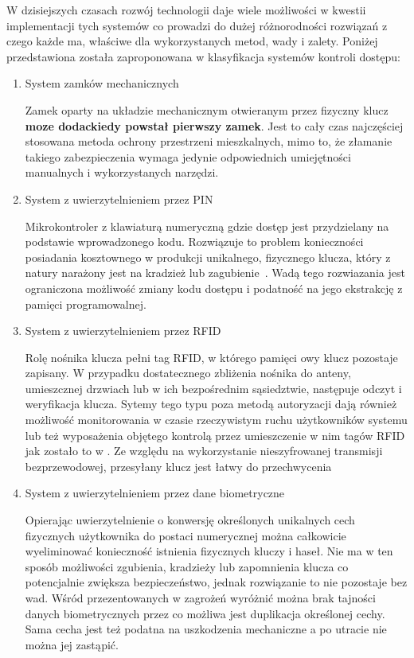 		W dzisiejszych czasach rozwój technologii daje wiele możliwości w kwestii implementacji tych systemów co prowadzi do dużej różnorodności rozwiązań z czego każde ma, właściwe dla wykorzystanych metod, wady i zalety. Poniżej przedstawiona została zaproponowana w \cite{access-system-survey} klasyfikacja systemów kontroli dostępu:
		\begin{enumerate}[label=\Alph*.]
			\item System zamków mechanicznych

				Zamek oparty na układzie mechanicznym otwieranym przez fizyczny klucz \textbf{moze dodackiedy powstał pierwszy zamek}. Jest to cały czas najczęściej stosowana metoda ochrony przestrzeni mieszkalnych, mimo to, że złamanie takiego zabezpieczenia wymaga jedynie odpowiednich umiejętności manualnych i wykorzystanych narzędzi.

			\item System z uwierzytelnieniem przez PIN

				Mikrokontroler z klawiaturą numeryczną gdzie dostęp jest przydzielany na podstawie wprowadzonego kodu. Rozwiązuje to problem konieczności posiadania kosztownego w produkcji unikalnego, fizycznego klucza, który z natury narażony jest na kradzież lub zagubienie~\cite{keypad-access-system}. Wadą tego rozwiazania jest ograniczona możliwość zmiany kodu dostępu i podatność na jego ekstrakcję z pamięci programowalnej.

			\item System z uwierzytelnieniem przez RFID

				Rolę nośnika klucza pełni tag RFID, w którego pamięci owy klucz pozostaje zapisany. W przypadku dostatecznego zbliżenia nośnika do anteny, umieszcznej drzwiach lub w ich bezpośrednim sąsiedztwie, następuje odczyt i weryfikacja klucza. Sytemy tego typu poza metodą autoryzacji dają również możliwość monitorowania w czasie rzeczywistym ruchu użytkowników systemu lub też wyposażenia objętego kontrolą przez umieszczenie w nim tagów RFID jak zostało to  w \cite{rfid-access-system-for-university}. Ze względu na wykorzystanie nieszyfrowanej transmisji bezprzewodowej, przesyłany klucz jest łatwy do przechwycenia

			\item System z uwierzytelnieniem przez dane biometryczne

				Opierając uwierzytelnienie o konwersję określonych unikalnych cech fizycznych użytkownika do postaci numerycznej można całkowicie wyeliminować konieczność istnienia fizycznych kluczy i haseł. Nie ma w ten sposób możliwości zgubienia, kradzieży lub zapomnienia klucza co potencjalnie zwiększa bezpieczeństwo, jednak rozwiązanie to nie pozostaje bez wad. Wśród przezentowanych w \cite{biometric-system-vulnerabilities} zagrożeń wyróżnić można brak tajności danych biometrycznych przez co możliwa jest duplikacja określonej cechy. Sama cecha jest też podatna na uszkodzenia mechaniczne a po utracie nie można jej zastąpić.


\end{enumerate}
